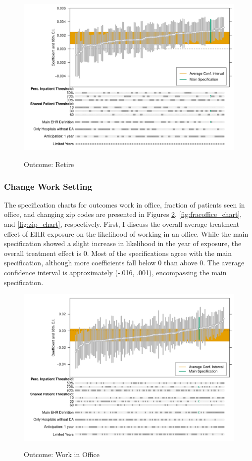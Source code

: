 \documentclass[12pt]{article}
\begin{document}
\begin{figure}[ht]
    \centering
    \caption{Outcome: Retire}
    \includegraphics[scale=.6]{Objects/retire_chart.pdf}
    \label{fig:retire_chart}
\end{figure}

\subsubsection{Change Work Setting}

The specification charts for outcomes work in office, fraction of patients seen in office, and changing zip codes are presented in Figures \ref{fig:work_chart}, \ref{fig:fracoffice_chart}, and \ref{fig:zip_chart}, respectively. First, I discuss the overall average treatment effect of EHR exposure on the likelihood of working in an office. While the main specification showed a slight increase in likelihood in the year of exposure, the overall treatment effect is 0. Most of the specifications agree with the main specification, although more coefficients fall below 0 than above 0. The average confidence interval is approximately (-.016, .001), encompassing the main specification.  

\begin{figure}[ht]
    \centering
    \caption{Outcome: Work in Office}
    \includegraphics[scale=.6]{Objects/office_chart.pdf}
    \label{fig:work_chart}
\end{figure}
\end{document}
